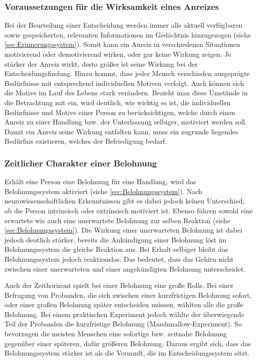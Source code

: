 \subsubsection{Voraussetzungen für die Wirksamkeit eines Anreizes}
Bei der Beurteilung einer Entscheidung werden immer alle aktuell verfügbaren sowie gespeicherten, relevanten Informationen im Gedächtnis hinzugezogen (siehe \ref{sec:Erinnerungssystem}). Somit kann ein Anreiz in verschiedenen Situationen motivierend oder demotivierend wirken, oder gar keine Wirkung zeigen. Je stärker der Anreiz wirkt, desto größer ist seine Wirkung bei der Entscheidungsfindung. Hinzu kommt, dass jeder Mensch verschieden ausgeprägte Bedürfnisse mit entsprechend individuellen Motiven verfolgt. Auch können sich die Motive im Lauf des Lebens stark verändern. \citep[S. 70]{Nowka.2013}
Bezieht man diese Umstände in die Betrachtung mit ein, wird deutlich, wie wichtig es ist, die individuellen Bedürfnisse und Motive einer Person zu berücksichtigen, welche durch einen Anreiz zu einer Handlung bzw. der Unterlassung selbiger, motiviert werden soll. Damit ein Anreiz seine Wirkung entfalten kann, muss ein zugrunde liegendes Bedürfnis existieren, welches der Befriedigung bedarf. \citep[S. 78]{Nowka.2013}

\newpage
\subsubsection{Zeitlicher Charakter einer Belohnung}
Erhält eine Person eine Belohnung für eine Handlung, wird das Belohnungssystem aktiviert (siehe \ref{sec:Belohnungssystem}). Nach neurowissenschaftlichen Erkenntnissen gibt es dabei jedoch keinen Unterschied, ob die Person intrinsisch oder extrinsisch motiviert ist. \citep[S. 71]{Nowka.2013}
Ebenso führen sowohl eine erwartete wie auch eine unerwartete Belohnung zur selben Reaktion (siehe \ref{sec:Belohnungssystem}). Die Wirkung einer unerwarteten Belohnung ist dabei jedoch deutlich stärker,  bereits die Ankündigung einer Belohnung löst im Belohnungssystem die gleiche Reaktion aus. Bei Erhalt selbiger bleibt das Belohnungssystem jedoch reaktionslos. Das bedeutet, dass das Gehirn nicht zwischen einer unerwarteten und einer angekündigten Belohnung unterscheidet. \citep[S. 71f]{Nowka.2013}
 
Auch der Zeithorizont spielt bei einer Belohnung eine große Rolle. Bei einer Befragung von Probanden, die sich zwischen einer kurzfristigen Belohnung sofort, oder einer großen Belohnung später entscheiden müssen, wählten alle die große Belohnung. Bei einem praktischen Experiment jedoch wählte der überwiegende Teil der Probanden die kurzfristige Belohnung (Marshmallow-Experiment). So bevorzugen die meisten Menschen eine sofortige bzw. zeitnahe Belohnung gegenüber einer späteren, dafür größeren Belohnung. Daraus ergibt sich, dass das Belohnungssystem stärker ist als die Vernunft, die im Entscheidungssystem sitzt. \citep[S. 19]{Seelbach.2011}

